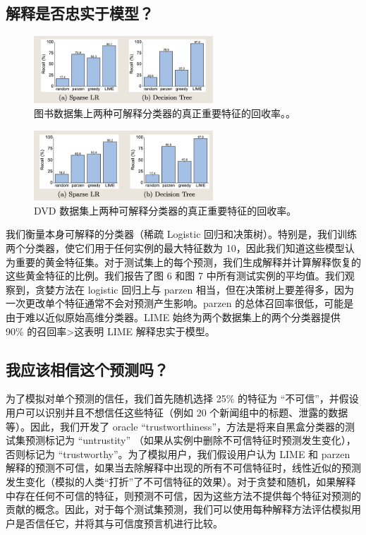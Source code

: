 \documentclass[12pt, a4paper]{ctexart} %
\begin{document}
\subsection{解释是否忠实于模型？}
\begin{figure}[htbp]
    \centering
    \includegraphics[width=0.6\textwidth]{img/img_6.png}
    \caption{图书数据集上两种可解释分类器的真正重要特征的回收率。。}
    \label{fig:img_6}
\end{figure}
\begin{figure}[h]
    \centering
    \includegraphics[width=0.6\textwidth]{img/img_7.png}
    \caption{DVD 数据集上两种可解释分类器的真正重要特征的回收率。}
    \label{fig:img_7}
\end{figure}
我们衡量本身可解释的分类器（稀疏 Logistic 回归和决策树）。特别是，我们训练两个分类器，使它们用于任何实例的最大特征数为 10，因此我们知道这些模型认为重要的黄金特征集。对于测试集上的每个预测，我们生成解释并计算解释恢复的这些黄金特征的比例。我们报告了图 6 和图 7 中所有测试实例的平均值。我们观察到，贪婪方法在 logistic 回归上与 parzen 相当，但在决策树上要差得多，因为一次更改单个特征通常不会对预测产生影响。parzen 的总体召回率很低，可能是由于难以近似原始高维分类器。LIME 始终为两个数据集上的两个分类器提供 90\% 的召回率>这表明 LIME 解释忠实于模型。

\subsection{我应该相信这个预测吗？}
为了模拟对单个预测的信任，我们首先随机选择 25\% 的特征为 “不可信”，并假设用户可以识别并且不想信任这些特征（例如 20 个新闻组中的标题、泄露的数据等）。因此，我们开发了 oracle “trustworthiness”，方法是将来自黑盒分类器的测试集预测标记为 “untrustity” （如果从实例中删除不可信特征时预测发生变化），否则标记为 “trustworthy”。为了模拟用户，我们假设用户认为 LIME 和 parzen 解释的预测不可信，如果当去除解释中出现的所有不可信特征时，线性近似的预测发生变化（模拟的人类“打折”了不可信特征的效果）。对于贪婪和随机，如果解释中存在任何不可信的特征，则预测不可信，因为这些方法不提供每个特征对预测的贡献的概念。因此，对于每个测试集预测，我们可以使用每种解释方法评估模拟用户是否信任它，并将其与可信度预言机进行比较。
\end{document}
